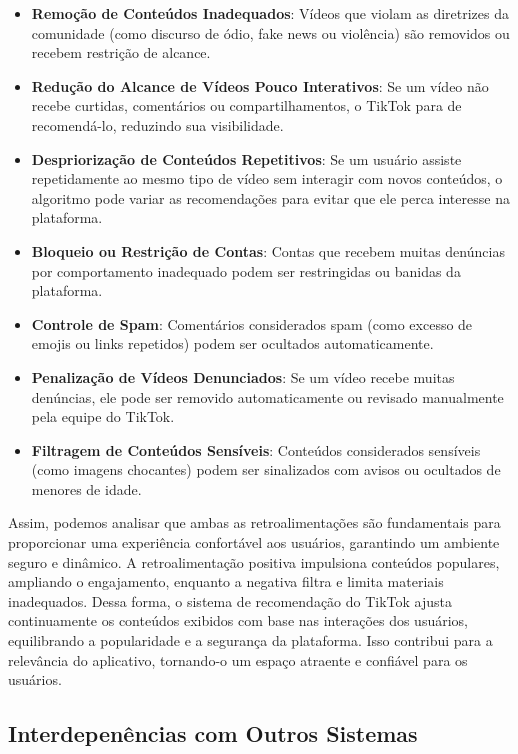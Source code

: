\begin{itemize}
\item \textbf{Remoção de Conteúdos Inadequados}:
Vídeos que violam as diretrizes da comunidade (como discurso de ódio, fake news ou violência) são removidos ou recebem restrição de alcance.

\item \textbf{Redução do Alcance de Vídeos Pouco Interativos}:
Se um vídeo não recebe curtidas, comentários ou compartilhamentos, o TikTok para de recomendá-lo, reduzindo sua visibilidade.

\item \textbf{Despriorização de Conteúdos Repetitivos}:
Se um usuário assiste repetidamente ao mesmo tipo de vídeo sem interagir com novos conteúdos, o algoritmo pode variar as recomendações para evitar que ele perca interesse na plataforma.

\item \textbf{Bloqueio ou Restrição de Contas}:
Contas que recebem muitas denúncias por comportamento inadequado podem ser restringidas ou banidas da plataforma.

\item \textbf{Controle de Spam}: 
Comentários considerados spam (como excesso de emojis ou links repetidos) podem ser ocultados automaticamente.

\item \textbf{Penalização de Vídeos Denunciados}:
Se um vídeo recebe muitas denúncias, ele pode ser removido automaticamente ou revisado manualmente pela equipe do TikTok.

\item \textbf{Filtragem de Conteúdos Sensíveis}:
Conteúdos considerados sensíveis (como imagens chocantes) podem ser sinalizados com avisos ou ocultados de menores de idade.
\end{itemize}



Assim, podemos analisar que ambas as retroalimentações são fundamentais para proporcionar uma experiência confortável aos usuários, garantindo um ambiente seguro e dinâmico. A retroalimentação positiva impulsiona conteúdos populares, ampliando o engajamento, enquanto a negativa filtra e limita materiais inadequados. Dessa forma, o sistema de recomendação do TikTok ajusta continuamente os conteúdos exibidos com base nas interações dos usuários, equilibrando a popularidade e a segurança da plataforma. Isso contribui para a relevância do aplicativo, tornando-o um espaço atraente e confiável para os usuários.



\newpage
\subsection{Interdepenências com Outros Sistemas}